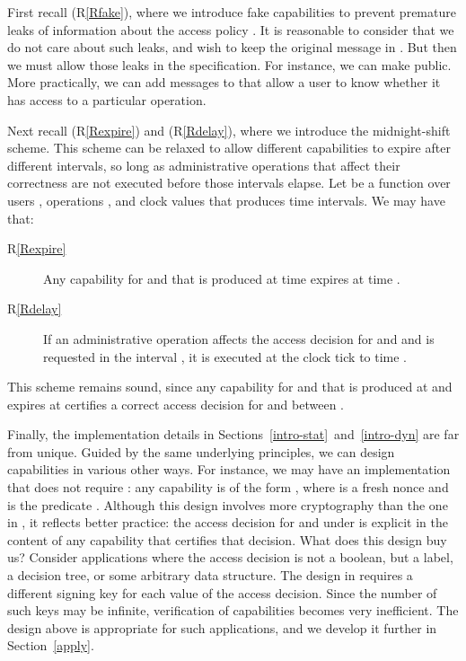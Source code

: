 \documentclass[10pt]{article}
\begin{document}
First recall (R\ref{Rfake}), where we introduce fake capabilities to prevent premature leaks of information about the access policy . It is reasonable to consider that we do not care about such leaks, and wish to keep the original message   in . But then we must allow those leaks in the specification. For instance, we can make  public. 
More practically, we can add messages to  that allow a user to know whether it has access to a particular operation.


Next recall (R\ref{Rexpire}) and (R\ref{Rdelay}), where we introduce the midnight-shift scheme. This scheme can be relaxed to allow different capabilities to expire after different intervals, so long as administrative operations that affect their correctness are not executed before those intervals elapse. Let  be a function over users , operations , and clock values  that produces time intervals. We may have that:
\begin{description}
\item[R\ref{Rexpire}] Any capability for  and  that is produced at time  expires at time .
\item[R\ref{Rdelay}] If an administrative operation affects the access decision for  and  and is requested in the interval , it is executed at the clock tick to time .  
\end{description}
This scheme remains sound, since any capability for  and  that is produced at  and expires at  certifies a correct access decision for  and  between .

Finally, the implementation details in Sections~\ref{intro-stat}~and~\ref{intro-dyn} are far from unique. Guided by the same underlying principles, we can design capabilities in various other ways. For instance, we may have an implementation that does not require : any capability is of the form , where  is a fresh nonce and  is the predicate .
Although this design involves more cryptography than the one in , it reflects better practice: the access decision for  and  under  is explicit in the content of any capability that certifies that decision. What does this design buy us? Consider applications where the access decision is not a boolean, but a label, a decision tree, or some arbitrary data structure. 
The design in  requires a different signing key for each value of the access decision. Since the number of such keys may be infinite, verification of capabilities becomes very inefficient. The design above is appropriate for such applications, and we develop it further in Section~\ref{apply}. 
\end{document}
